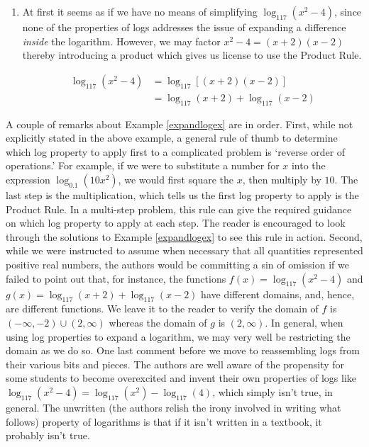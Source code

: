 {\begin{enumerate}
\item  At first it seems as if we have no means of simplifying $\log_{117}\left(x^2-4\right)$, since none of the properties of logs addresses the issue of expanding a difference \textit{inside} the logarithm.  However, we may factor $x^2 - 4 = (x+2)(x-2)$ thereby introducing a product which gives us license to use the Product Rule.

\begin{align*}
\log_{117}\left(x^2-4\right) & =  \log_{117} \left[(x+2)(x-2)\right]  \tag*{Factor} \\
 & =  \log_{117}(x+2) + \log_{117}(x-2)  \tag*{Product Rule} 
\end{align*}

\end{enumerate}
}

\medskip

A couple of remarks about Example \ref{expandlogex} are in order.  First, while not explicitly stated in the above example, a general rule of thumb to determine which log property to apply first to a complicated problem is `reverse order of operations.'  For example, if we were to substitute a number for $x$ into the expression $\log_{0.1} \left(10 x^2 \right)$, we would first square the $x$, then multiply by $10$.  The last step is the multiplication, which tells us the first log property to apply is the Product Rule.  In a multi-step problem, this rule can give the required guidance on which log property to apply at each step.  The reader is encouraged to look through the solutions to Example \ref{expandlogex} to see this rule in action.  Second, while we were instructed to assume when necessary that all quantities represented positive real numbers, the authors would be committing a sin of omission if we failed to point out that, for instance, the functions $f(x) = \log_{117}\left(x^2-4\right)$ and $g(x) = \log_{117}(x+2) + \log_{117}(x-2)$ have different domains, and, hence, are different functions. We leave it to the reader to verify the domain of $f$ is $(-\infty, -2) \cup (2,\infty)$ whereas the domain of $g$ is $(2,\infty)$.  In general, when using log properties to expand a logarithm, we may very well be restricting the domain as we do so.  One last comment before we move to reassembling logs from their various bits and pieces. The authors are well aware of the propensity for some students to become overexcited and invent their own properties of logs like $\log_{117}\left(x^2-4\right) = \log_{117}\left(x^2\right) - \log_{117}(4)$, which simply isn't true, in general.  The unwritten (the authors relish the irony involved in writing what follows) property of logarithms is that if it isn't written in a textbook, it probably isn't true.    

